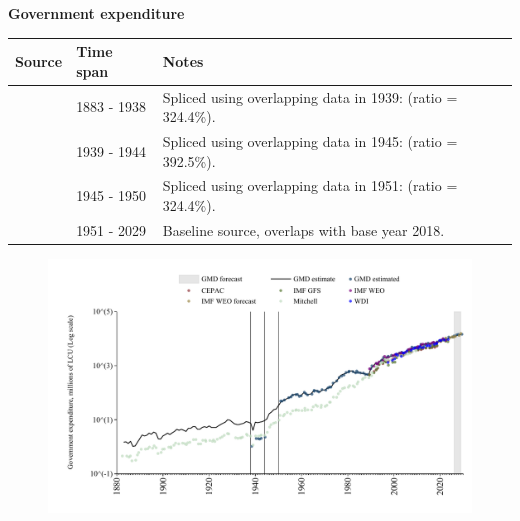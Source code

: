 \documentclass[12pt,a4paper,landscape]{article}
\begin{document}
\begin{adjustbox}{max totalsize={\paperwidth}{\paperheight},center}
\begin{minipage}[t][\textheight][t]{\textwidth}
\vspace*{0.5cm}
{}
\begin{center}
{\Large\bfseries Government expenditure}
\end{center}
\vspace{0.5cm}
\begin{table}[H]
\centering
\small
\begin{tabular}{|l|l|l|}
\hline
\textbf{Source} & \textbf{Time span} & \textbf{Notes} \\
\hline
\rowcolor{white}\cite{Mitchell}& 1883 - 1938 &Spliced using overlapping data in 1939: (ratio = 324.4\%). \\
\rowcolor{lightgray}\cite{GMD_estimated}& 1939 - 1944 &Spliced using overlapping data in 1945: (ratio = 392.5\%). \\
\rowcolor{white}\cite{Mitchell}& 1945 - 1950 &Spliced using overlapping data in 1951: (ratio = 324.4\%). \\
\rowcolor{lightgray}\cite{GMD_estimated}& 1951 - 2029 &Baseline source, overlaps with base year 2018. \\
\hline
\end{tabular}
\end{table}
\begin{figure}[H]
\centering
\includegraphics[width=\textwidth,height=0.6\textheight,keepaspectratio]{graphs/SLV_govexp.pdf}
\end{figure}
\end{minipage}
\end{adjustbox}
\end{document}
